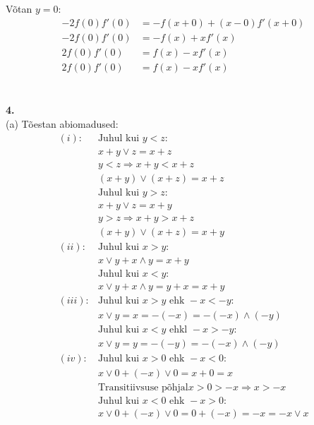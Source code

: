 \documentclass{article}
\begin{document}
V\~otan $y=0$:
\begin{equation*}
\begin{aligned}
-2f(0)f'(0)&=-f(x+0)+(x-0)f'(x+0)\\
-2f(0)f'(0)&=-f(x)+xf'(x)\\
2f(0)f'(0)&=f(x)-xf'(x)\\
2f(0)f'(0)&=f(x)-xf'(x)\\
\end{aligned}
\end{equation*}
\fi
\iffalse
\pagebreak\\
\textbf{5.}
\begin{equation*}
\int_{-\pi/2}^{\pi/2}\ln(\cos x)dx
\end{equation*}
Leian m\"a\"aramata integraali ositi kahekordse ositi integreerimisega:
\begin{gather*}
u_1=\ln(\cos x)\quad du_1=\frac{\sin x}{\cos x}dx = \tan x\ dx\\
dv_1=dx\quad v_1=x\\
\int\ln(\cos x)dx = x\ln(\cos x)-\int x\tan x\ dx\\
u_2=x\quad du_2=dx\\
dv_2=\tan x\ dx\quad v_2=\frac{1}{\cos^2 x}\\
\int x\tan x\ dx = \frac{x}{\cos^2 x} - \int\frac{1}{\cos^2}
\end{gather*}
\fi
\pagebreak\\
\textbf{4.}\\
(a) T\~oestan abiomadused:
\begin{equation*}
\begin{aligned}
(i):& \text{Juhul kui }y<z:\\
&x+y\lor z = x+z\\
&y<z \Rightarrow x+y<x+z\\
&(x+y)\lor(x+z)=x+z\\
& \text{Juhul kui }y>z:\\
&x+y\lor z = x+y\\
&y>z \Rightarrow x+y>x+z\\
&(x+y)\lor(x+z)=x+y\\
(ii):&\text{Juhul kui }x>y:\\
&x\lor y+x\land y = x+y\\
&\text{Juhul kui }x<y:\\
&x\lor y+x\land y = y+x=x+y\\
(iii):&\text{Juhul kui }x>y\text{ ehk }-x<-y:\\
&x\lor y=x=-(-x)=-(-x)\land(-y)\\
&\text{Juhul kui }x<y\text{ ehkl }-x>-y:\\
&x\lor y=y=-(-y)=-(-x)\land(-y)\\
(iv):&\text{Juhul kui }x>0\text{ ehk }-x<0:\\
&x\lor0+(-x)\lor0=x+0=x\\
&\text{Transitiivsuse p\~ohjal}x>0>-x\Rightarrow x>-x\\
&\text{Juhul kui }x<0\text{ ehk }-x>0:\\
&x\lor0+(-x)\lor0=0+(-x)=-x=-x\lor x\\
\end{aligned}
\end{equation*}
\end{document}
